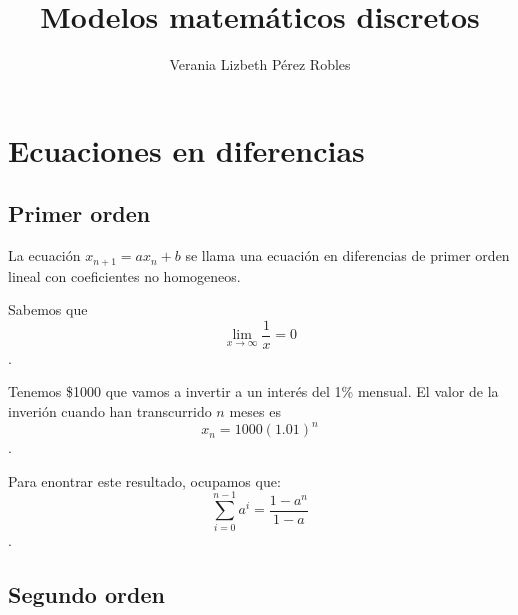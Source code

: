 \documentclass{article}
\title{Modelos matemáticos discretos}
\author{Verania Lizbeth Pérez Robles}
\begin{document}
\maketitle
\section{Ecuaciones en diferencias}
\subsection{Primer orden}

La ecuación $x_{n+1}=ax_n+b$ se llama una ecuación en diferencias de primer orden lineal con coeficientes no homogeneos.

Sabemos que $$\lim_{x\to\infty}\frac{1}{x}=0$$.

Tenemos \$1000 que vamos a invertir a un interés del 1\% mensual.
El valor de la inverión cuando han transcurrido $n$ meses es $$x_n=1000(1.01)^n$$.

Para enontrar este resultado, ocupamos que:
$$\sum_{i=0}^{n-1}a^{i}=\frac{1-a^{n}}{1-a}$$.
\subsection{Segundo orden}
\end{document}
